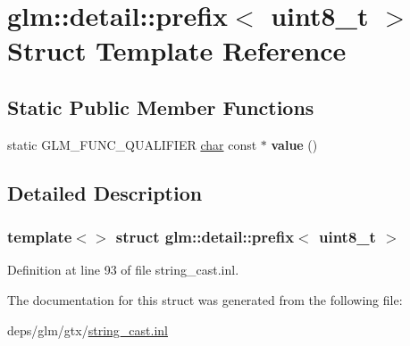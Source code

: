\hypertarget{structglm_1_1detail_1_1prefix_3_01uint8__t_01_4}{}\section{glm\+:\+:detail\+:\+:prefix$<$ uint8\+\_\+t $>$ Struct Template Reference}
\label{structglm_1_1detail_1_1prefix_3_01uint8__t_01_4}
\subsection*{Static Public Member Functions}
\begin{DoxyCompactItemize}
\item 
\mbox{\label{structglm_1_1detail_1_1prefix_3_01uint8__t_01_4_a890818b4dedbe09730336c1ae3913339}} 
static G\+L\+M\+\_\+\+F\+U\+N\+C\+\_\+\+Q\+U\+A\+L\+I\+F\+I\+ER \hyperlink{classchar}{char} const  $\ast$ {\bfseries value} ()
\end{DoxyCompactItemize}


\subsection{Detailed Description}
\subsubsection*{template$<$$>$\newline
struct glm\+::detail\+::prefix$<$ uint8\+\_\+t $>$}



Definition at line 93 of file string\+\_\+cast.\+inl.



The documentation for this struct was generated from the following file\+:\begin{DoxyCompactItemize}
\item 
deps/glm/gtx/\hyperlink{string__cast_8inl}{string\+\_\+cast.\+inl}\end{DoxyCompactItemize}
